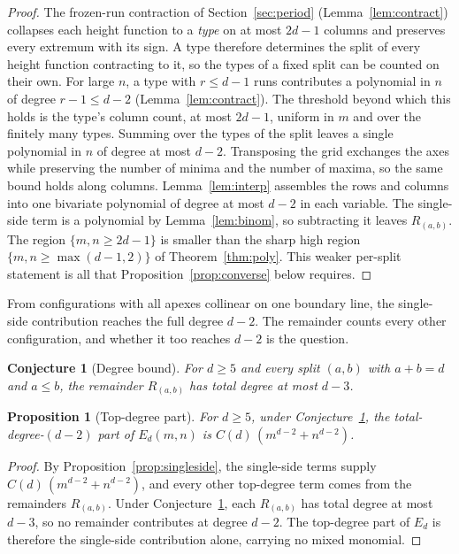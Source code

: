 \documentclass[11pt]{article}
\newtheorem{proposition}[theorem]{Proposition}
\newtheorem{conjecture}[theorem]{Conjecture}
\theoremstyle{definition}
\theoremstyle{remark}
\begin{document}
\begin{proof}
The frozen-run contraction of Section~\ref{sec:period} (Lemma~\ref{lem:contract})
collapses each height function to a \emph{type} on at most $2d-1$ columns and
preserves every extremum with its sign. A type therefore determines the split of every
height function contracting to it, so the types of a fixed split can be counted on
their own. For large $n$, a type with $r\le d-1$ runs contributes a polynomial in $n$ of
degree $r-1\le d-2$ (Lemma~\ref{lem:contract}). The threshold beyond
which this holds is the type's column count, at most $2d-1$, uniform in $m$ and
over the finitely many types. Summing over the types of the split leaves a single
polynomial in $n$ of degree at most $d-2$. Transposing the grid exchanges the axes
while preserving the number of minima and the number of maxima, so the same bound
holds along columns. Lemma~\ref{lem:interp} assembles the rows and columns into
one bivariate polynomial of degree at most $d-2$ in each variable. The
single-side term is a polynomial by Lemma~\ref{lem:binom}, so subtracting it
leaves $R_{(a,b)}$. The region $\{m,n\ge2d-1\}$ is smaller than the sharp high
region $\{m,n\ge\max(d-1,2)\}$ of Theorem~\ref{thm:poly}. This weaker per-split
statement is all that Proposition~\ref{prop:converse} below requires.
\end{proof}

From configurations with all apexes collinear on one boundary line, the
single-side contribution reaches the full degree $d-2$. The remainder counts every other
configuration, and whether it too reaches $d-2$ is the question.

\begin{conjecture}[Degree bound]\label{conj:G2}
For $d\ge5$ and every split $(a,b)$ with $a+b=d$ and $a\le b$, the remainder $R_{(a,b)}$
has total degree at most $d-3$.
\end{conjecture}

\begin{proposition}[Top-degree part]\label{prop:leading}
For $d\ge5$, under Conjecture~\ref{conj:G2}, the total-degree-$(d-2)$ part of
$E_d(m,n)$ is $C(d)\,(m^{d-2}+n^{d-2})$.
\end{proposition}

\begin{proof}
By Proposition~\ref{prop:singleside}, the single-side terms supply
$C(d)\,(m^{d-2}+n^{d-2})$, and every other top-degree term comes from the
remainders $R_{(a,b)}$. Under Conjecture~\ref{conj:G2}, each $R_{(a,b)}$ has total
degree at most $d-3$, so no remainder contributes at degree $d-2$. The
top-degree part of $E_d$ is therefore the single-side contribution alone,
carrying no mixed monomial.
\end{proof}
\end{document}
